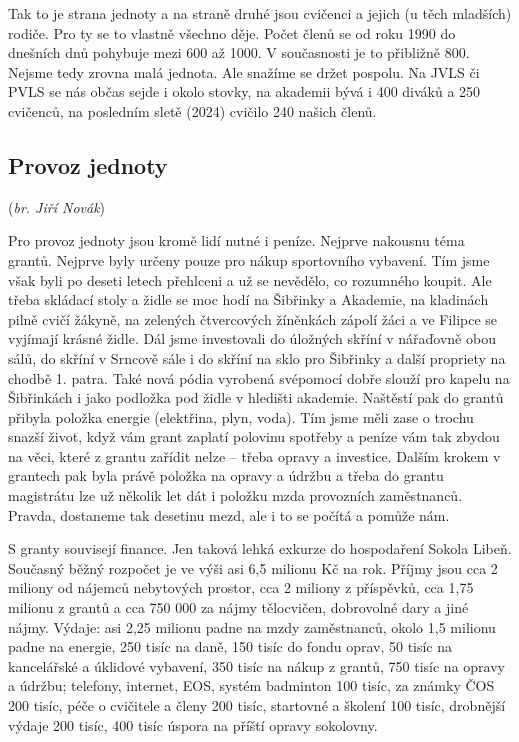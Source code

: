 Tak to je strana jednoty a na straně druhé jsou cvičenci a jejich (u
těch mladších) rodiče. Pro ty se to vlastně všechno děje. Počet členů se
od roku 1990 do dnešních dnů pohybuje mezi 600 až 1000. V současnosti je
to přibližně 800. Nejsme tedy zrovna malá jednota. Ale snažíme se držet
pospolu. Na JVLS či PVLS se nás občas sejde i okolo stovky, na akademii
bývá i 400 diváků a 250 cvičenců, na posledním sletě (2024) cvičilo 240
našich členů.

\subsection{\texorpdfstring{Provoz jednoty
}{Provoz jednoty }}\label{provoz-jednoty}

(\emph{br. Jiří Novák})

Pro provoz jednoty jsou kromě lidí nutné i peníze. Nejprve nakousnu téma
grantů. Nejprve byly určeny pouze pro nákup sportovního vybavení. Tím
jsme však byli po deseti letech přehlceni a už se nevědělo, co rozumného
koupit. Ale třeba skládací stoly a židle se moc hodí na Šibřinky a
Akademie, na kladinách pilně cvičí žákyně, na zelených čtvercových
žíněnkách zápolí žáci a ve Filipce se vyjímají krásné židle. Dál jsme
investovali do úložných skříní v nářaďovně obou sálů, do skříní v
Srncově sále i do skříní na sklo pro Šibřinky a další propriety na
chodbě 1. patra. Také nová pódia vyrobená svépomocí dobře slouží pro
kapelu na Šibřinkách i jako podložka pod židle v hledišti akademie.
Naštěstí pak do grantů přibyla položka energie (elektřina, plyn, voda).
Tím jsme měli zase o trochu snazší život, když vám grant zaplatí
polovinu spotřeby a peníze vám tak zbydou na věci, které z grantu
zařídit nelze -- třeba opravy a investice. Dalším krokem v grantech pak
byla právě položka na opravy a údržbu a třeba do grantu magistrátu lze
už několik let dát i položku mzda provozních zaměstnanců. Pravda,
dostaneme tak desetinu mezd, ale i to se počítá a pomůže nám.

S granty souvisejí finance. Jen taková lehká exkurze do hospodaření
Sokola Libeň. Současný běžný rozpočet je ve výši asi 6,5 milionu Kč na
rok. Příjmy jsou cca 2 miliony od nájemců nebytových prostor, cca 2
miliony z příspěvků, cca 1,75 milionu z grantů a cca 750 000 za nájmy
tělocvičen, dobrovolné dary a jiné nájmy. Výdaje: asi 2,25 milionu padne
na mzdy zaměstnanců, okolo 1,5 milionu padne na energie, 250 tisíc na
daně, 150 tisíc do fondu oprav, 50 tisíc na kancelářské a úklidové
vybavení, 350 tisíc na nákup z grantů, 750 tisíc na opravy a údržbu;
telefony, internet, EOS, systém badminton 100 tisíc, za známky ČOS 200
tisíc, péče o cvičitele a členy 200 tisíc, startovné a školení 100
tisíc, drobnější výdaje 200 tisíc, 400 tisíc úspora na příští opravy
sokolovny.

